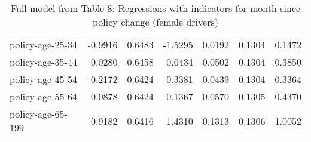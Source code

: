 \documentclass[10pt]{article}
\begin{document}
\begin{table}[ht]
\begin{tabular}{lrrrrrr}
  policy-age-25-34 & -0.9916 & 0.6483 & -1.5295 & 0.0192 & 0.1304 & 0.1472 \\ 
  policy-age-35-44 & 0.0280 & 0.6458 & 0.0434 & 0.0502 & 0.1304 & 0.3850 \\ 
  policy-age-45-54 & -0.2172 & 0.6424 & -0.3381 & 0.0439 & 0.1304 & 0.3364 \\ 
  policy-age-55-64 & 0.0878 & 0.6424 & 0.1367 & 0.0570 & 0.1305 & 0.4370 \\ 
  policy-age-65-199 & 0.9182 & 0.6416 & 1.4310 & 0.1313 & 0.1306 & 1.0052 \\ 
   \hline
\end{tabular}
\caption{Full model from Table 8: Regressions with indicators for month since policy change (female drivers)} 
\label{tab_8_all_pts_F}
\end{table}


\clearpage
\pagebreak



% 



\end{document}

